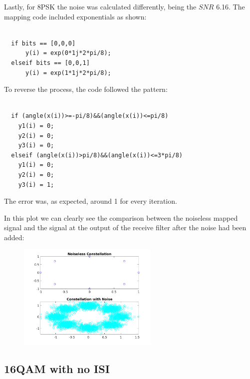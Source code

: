 \documentclass[a4paper,11pt]{article}
\begin{document}
Lastly, for 8PSK the noise was calculated differently, being the $SNR$ 6.16.
The mapping code included exponentials as shown:

\bigskip
\begin{lstlisting}

  if bits == [0,0,0]
      y(i) = exp(0*1j*2*pi/8);
  elseif bits == [0,0,1]
      y(i) = exp(1*1j*2*pi/8);

\end{lstlisting}
\bigskip

To reverse the process, the code followed the pattern:

\bigskip
\begin{lstlisting}

  if (angle(x(i))>=-pi/8)&&(angle(x(i))<=pi/8)
    y1(i) = 0;
    y2(i) = 0;
    y3(i) = 0;
  elseif (angle(x(i))>pi/8)&&(angle(x(i))<=3*pi/8)
    y1(i) = 0;
    y2(i) = 0;
    y3(i) = 1;

\end{lstlisting}
\bigskip

The error was, as expected, around 1 for every iteration.

In this plot we can clearly see the comparison between the noiseless mapped
signal and the signal at the output of the receive filter after the noise had
been added:

\begin{figure}[!hp]
    \begin{center}
      \includegraphics[width=0.6\textwidth]{images/8PSK.png}
    \end{center}
\end{figure}

\newpage


\subsection{16QAM with no ISI}
\end{document}
